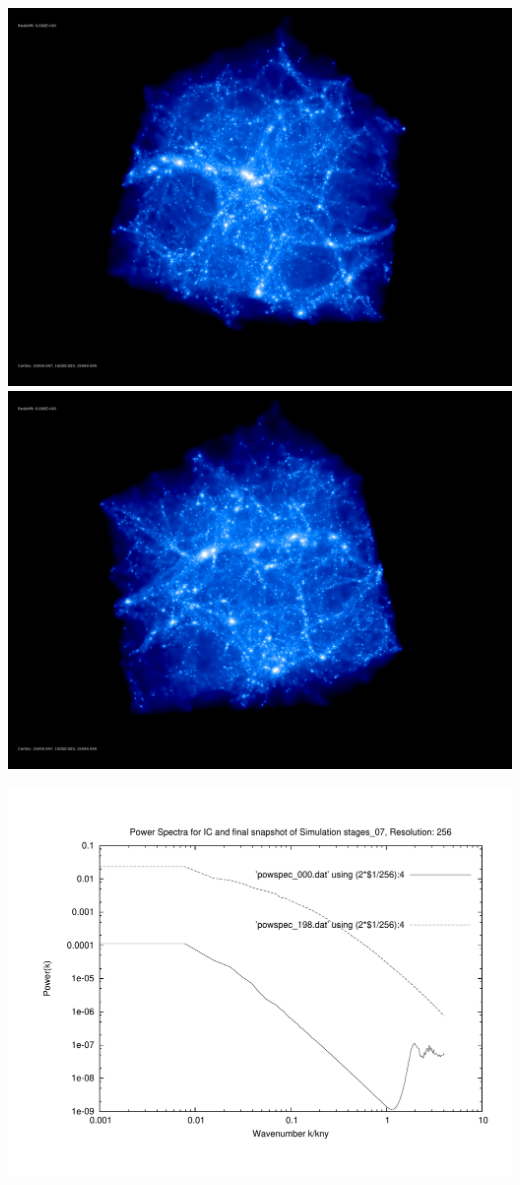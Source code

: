 \includegraphics[scale=0.1]{r256/stages_07/rotate_00074.jpg} 
\includegraphics[scale=0.1]{r256/stages_07/rotate_00131.jpg}

\includegraphics[scale=0.5]{r256/stages_07/plot_powspec_stages_07}

